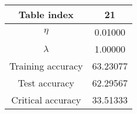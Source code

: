 \begin{tabular}{cc}
\hline \hline
Table index &        21 \\
\hline \hline
$\eta$            &  0.01000 \\
$\lambda$         &  1.00000 \\
Training accuracy & 63.23077 \\
Test accuracy     & 62.29567 \\
Critical accuracy & 33.51333 \\
\hline \hline
\end{tabular}
